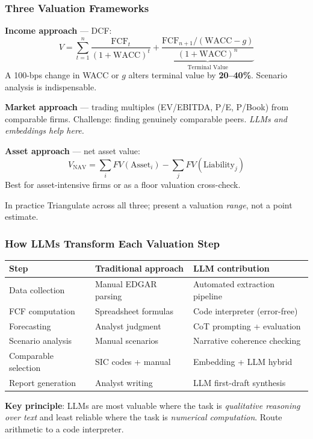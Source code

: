 \documentclass[9pt,t]{beamer}
\begin{document}
\begin{frame}
\frametitle{Three Valuation Frameworks}

\textbf{Income approach} — DCF:
\[
  V = \sum_{t=1}^{n} \frac{\text{FCF}_t}{(1+\text{WACC})^t}
      + \underbrace{\frac{\text{FCF}_{n+1}/(\text{WACC}-g)}{(1+\text{WACC})^n}}_{\text{Terminal Value}}
\]
A 100-bps change in WACC or $g$ alters terminal value by \textbf{20--40\%}. Scenario analysis is indispensable.

\smallskip
\textbf{Market approach} — trading multiples (EV/EBITDA, P/E, P/Book) from comparable firms.
Challenge: finding genuinely comparable peers. \textit{LLMs and embeddings help here.}

\smallskip
\textbf{Asset approach} — net asset value:
\[
  V_{\text{NAV}} = \sum_i FV(\text{Asset}_i) - \sum_j FV(\text{Liability}_j)
\]
Best for asset-intensive firms or as a floor valuation cross-check.

\smallskip
\begin{block}{In practice}
Triangulate across all three; present a valuation \emph{range}, not a point estimate.
\end{block}
\end{frame}

\begin{frame}
\frametitle{How LLMs Transform Each Valuation Step}

\begin{center}
\begin{tabular}{lll}
\toprule
\textbf{Step} & \textbf{Traditional approach} & \textbf{LLM contribution} \\
\midrule
Data collection & Manual EDGAR parsing & Automated extraction pipeline \\
FCF computation & Spreadsheet formulas & Code interpreter (error-free) \\
Forecasting & Analyst judgment & CoT prompting + evaluation \\
Scenario analysis & Manual scenarios & Narrative coherence checking \\
Comparable selection & SIC codes + manual & Embedding + LLM hybrid \\
Report generation & Analyst writing & LLM first-draft synthesis \\
\bottomrule
\end{tabular}
\end{center}

\medskip
\begin{bigpicture}
\textbf{Key principle}: LLMs are most valuable where the task is
\emph{qualitative reasoning over text} and least reliable where the task
is \emph{numerical computation}. Route arithmetic to a code interpreter.
\end{bigpicture}
\end{frame}
\end{document}

